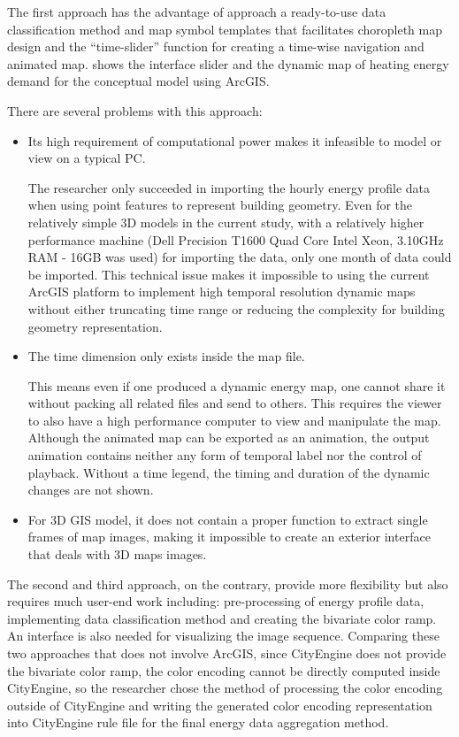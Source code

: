 The first approach has the advantage of approach a ready-to-use data
classification method and map symbol templates that facilitates
choropleth map design and the ``time-slider'' function for creating a
time-wise navigation and animated map.  shows the
interface slider and the dynamic map of heating energy demand for the
conceptual model using ArcGIS. 

There are several problems with this approach: 
\begin{itemize}
\item Its high requirement of computational power makes it infeasible
  to model or view on a typical PC.
  
  The researcher only succeeded in importing the hourly energy profile
  data when using point features to represent building geometry. Even
  for the relatively simple 3D models in the current study, with a
  relatively higher performance machine (Dell Precision T1600 Quad
  Core Intel Xeon, 3.10GHz RAM - 16GB was used) for importing the
  data, only one month of data could be imported. This technical issue
  makes it impossible to using the current ArcGIS platform to
  implement high temporal resolution dynamic maps without either
  truncating time range or reducing the complexity for building
  geometry representation.
\item The time dimension only exists inside the map file.

  This means even if one produced a dynamic energy map, one cannot
  share it without packing all related files and send to others. This
  requires the viewer to also have a high performance computer to view
  and manipulate the map. Although the animated map can be exported as
  an animation, the output animation contains neither any form of
  temporal label nor the control of playback. Without a time legend,
  the timing and duration of the dynamic changes are not shown.

\item For 3D GIS model, it does not contain a proper function to
  extract single frames of map images, making it impossible to create
  an exterior interface that deals with 3D maps images.

\end{itemize}

The second and third approach, on the contrary, provide more
flexibility but also requires much user-end work including:
pre-processing of energy profile data, implementing data
classification method and creating the bivariate color ramp. An
interface is also needed for visualizing the image sequence. Comparing
these two approaches that does not involve ArcGIS, since CityEngine
does not provide the bivariate color ramp, the color encoding cannot
be directly computed inside CityEngine, so the researcher chose the
method of processing the color encoding outside of CityEngine and
writing the generated color encoding representation into CityEngine
rule file for the final energy data aggregation method.

